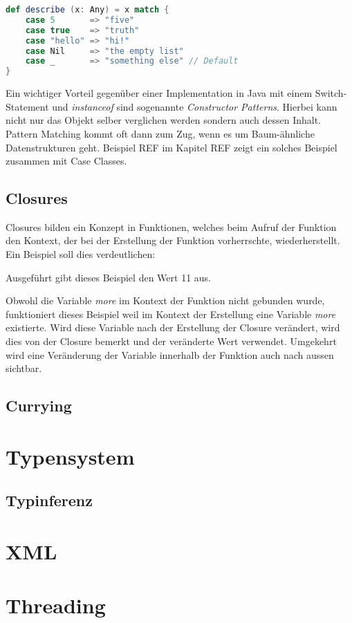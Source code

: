 \begin{lstlisting}[float=ht,language=scala,caption=Pattern Matching auf Litale \cite{odersky},label=lst:patternMatching]
def describe (x: Any) = x match {
	case 5       => "five"
	case true    => "truth"
	case "hello" => "hi!"
	case Nil     => "the empty list"
	case _       => "something else" // Default
}
\end{lstlisting}

Ein wichtiger Vorteil gegenüber einer Implementation in Java mit
einem Switch-Statement und \emph{instanceof} sind sogenannte 
\emph{Constructor Patterns}. Hierbei kann nicht nur das Objekt selber
verglichen werden sondern auch dessen Inhalt. \\

Pattern Matching kommt oft dann zum Zug, wenn es um Baum-ähnliche
Datenstrukturen geht. Beispiel REF im Kapitel REF zeigt ein solches
Beispiel zusammen mit Case Classes.

\subsection{Closures}

Closures bilden ein Konzept in Funktionen, welches beim Aufruf der 
Funktion den Kontext, der bei der Erstellung der Funktion vorherrschte,
wiederherstellt. \\

Ein Beispiel soll dies verdeutlichen:



Ausgeführt gibt dieses Beispiel den Wert 11 aus.

Obwohl die Variable \emph{more} im Kontext der Funktion nicht gebunden
wurde, funktioniert dieses Beispiel weil im Kontext der Erstellung eine
Variable \emph{more} existierte. Wird diese Variable nach der
Erstellung der Closure verändert, wird dies von der Closure bemerkt und 
der veränderte Wert verwendet. Umgekehrt wird eine Veränderung der
Variable innerhalb der Funktion auch nach aussen sichtbar.

\subsection{Currying}

\section{Typensystem}

\subsection{Typinferenz}

\section{XML}

\section{Threading}
